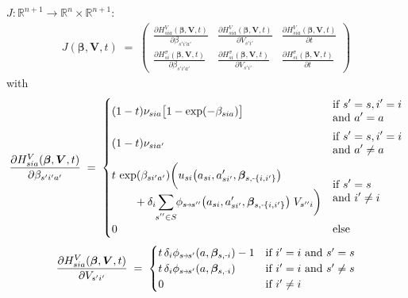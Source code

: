 \documentclass[11pt,fleqn]{article}
\newcommand{\R}{\mathbb{R}}
\newcommand{\bbeta}{\bm{\beta}}
\newcommand{\bV}{\bm{V}}
\newcommand{\shortminus}{{\text{\scalebox{0.4}[1.0]{\(-\)}}}}
\newcommand{\minusi}{\shortminus i}
\newcommand{\shortrightarrow}{\parbox{4pt}{\tikz{\draw[->](0,0)--(4pt,0);}}}
\newcommand{\phiss}{\phi_{s\shortrightarrow s'}}
\begin{document}
$J: \R^{n+1} \rightarrow \R^n \times \R^{n+1}$:
\begin{align*}
	J(\bbeta,\bV,t) \;=\; 
		\begin{pmatrix}
			\frac{ \partial H^V_{sia}(\bbeta,\bV,t) }{ \partial\beta_{s'i'a'} } 
				& \frac{ \partial H^V_{sia}(\bbeta,\bV,t) }{ \partial V_{s'i'} } 
				& \frac{ \partial H^V_{sia}(\bbeta,\bV,t) }{ \partial t } \\[1em] 
			\frac{ \partial H^\sigma_{si}(\bbeta,\bV,t) }{ \partial \beta_{s'i'a'} } 
				& \frac{ \partial H^\sigma_{si}(\bbeta,\bV,t) }{ \partial V_{s'i'} } 
				& \frac{ \partial H^\sigma_{si}(\bbeta,\bV,t) }{ \partial t }
		\end{pmatrix} 
\end{align*}
with
\begin{align*}
	\frac{ \partial H^V_{sia}(\bbeta,\bV,t) }{ \partial \beta_{s'i'a'} } \;=\; 
		\begin{cases}
			\begin{aligned}
				& (1-t) \nu_{sia} \bigl[1-\exp(-\beta_{sia})\bigr]
			\end{aligned} & 
			\begin{aligned}
				& \text{if } s'=s, i'=i \\ &\text{and } a'=a
			\end{aligned} \\[1em]
			\begin{aligned}
				& (1-t) \nu_{sia'}
			\end{aligned} & 
			\begin{aligned}
				& \text{if } s'=s, i'=i \\ &\text{and } a'\neq a
			\end{aligned} \\[1em]
			\begin{aligned} 
				& t \, \exp(\beta_{si'a'}) \biggl( u_{si}\bigl(a_{si},a_{si'}',\bbeta_{s,\shortminus\{i,i'\}}\bigr) \\
				& \qquad + \delta_i \sum\limits_{\mathclap{s''\in S}} \phi_{s\shortrightarrow s''}\bigl(a_{si},a_{si'}',\bbeta_{s,\shortminus\{i,i'\}}\bigr) \; V_{s''i} \biggr)
			\end{aligned} & 
			\begin{aligned}
				& \text{if } s'=s \\ &\text{and } i'\neq i  
			\end{aligned} \\[1em]
			0 & \text{else}
		\end{cases}
\end{align*}
\begin{align*}
	\frac{ \partial H^V_{sia}(\bbeta,\bV,t) }{ \partial V_{s'i'} } \;=\;
		\begin{cases}
			t \, \delta_i \phiss(a,\bbeta_{s,\minusi}) - 1 &\text{if } i'=i \text{ and } s'=s \\
			t \, \delta_i \phiss(a,\bbeta_{s,\minusi}) &\text{if } i'=i \text{ and } s'\neq s \\
			0 &\text{if } i'\neq i
		\end{cases}
\end{align*}
\end{document}
